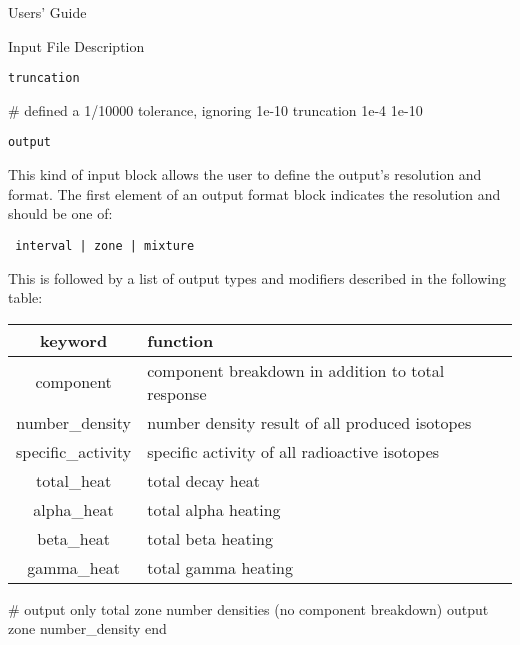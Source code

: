 \begin{chapter}{Users' Guide\label{app:user.guide}}
\begin{section}{Input File Description\label{app:user.input}}
\begin{subsection}{\texttt{truncation}\label{app:user.input.trunc}}
      \begin{center}
        \renewcommand{\baselinestretch}{1}\normalsize
        \begin{boxedverbatim}
# defined a 1/10000 tolerance, ignoring 1e-10
truncation   1e-4    1e-10
\end{boxedverbatim}
      \end{center}
      
    \end{subsection}

    \begin{subsection}{\texttt{output}\label{app:user.input.output}}
      
      This kind of input block allows the user to define the output's
      resolution and format.  The first element of an output format
      block indicates the resolution and should be one of:
      \begin{center}
        \texttt{ interval | zone | mixture }
      \end{center}
      This is followed by a list of output types and modifiers
      described in the following table:

      \begin{center}
        \renewcommand{\baselinestretch}{1}\normalsize
        \begin{tabular}{|c|l|}
          \hline
          keyword & function \\\hline\hline
          component & component breakdown in addition to total response\\\hline
          number\_density & number density result of all produced isotopes\\\hline
          specific\_activity & specific activity of all radioactive isotopes\\\hline
          total\_heat & total decay heat\\\hline
          alpha\_heat & total alpha heating\\\hline
          beta\_heat & total beta heating\\\hline
          gamma\_heat & total gamma heating\\\hline
        \end{tabular}

        \vspace{2\baselineskip}

        \begin{boxedverbatim}
# output only total zone number densities (no component breakdown)
output zone
   number_density
end


\end{boxedverbatim}
\end{center}
\end{subsection}
\end{section}
\end{chapter}
